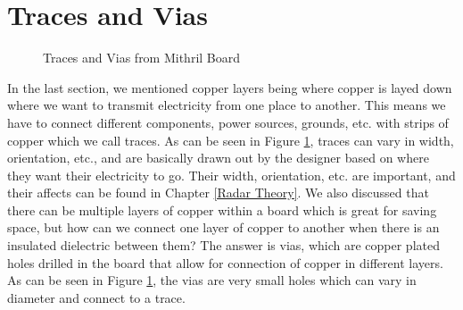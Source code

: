 \section{Traces and Vias}
\begin{figure}[H]
  \centering
\caption{Traces and Vias from Mithril Board}
\label{img:tracesandvias}
\end{figure}

In the last section, we mentioned copper layers being where copper is layed down where we want to transmit electricity from one place
to another. This means we have to connect different components, power sources, grounds, etc. with strips of copper which we call traces. As 
can be seen in Figure \ref{img:tracesandvias}, traces can vary in width, orientation, etc., and are basically drawn out by the designer based
on where they want their electricity to go. Their width, orientation, etc. are important, and their affects can be found in Chapter \ref{Radar Theory}.
We also discussed that there can be multiple layers of copper within a board which is great for saving space, but how can we connect one layer
of copper to another when there is an insulated dielectric between them? The answer is vias, which are copper plated holes drilled in the board
that allow for connection of copper in different layers. As can be seen in Figure \ref{img:tracesandvias}, the vias are very small holes which
can vary in diameter and connect to a trace.

